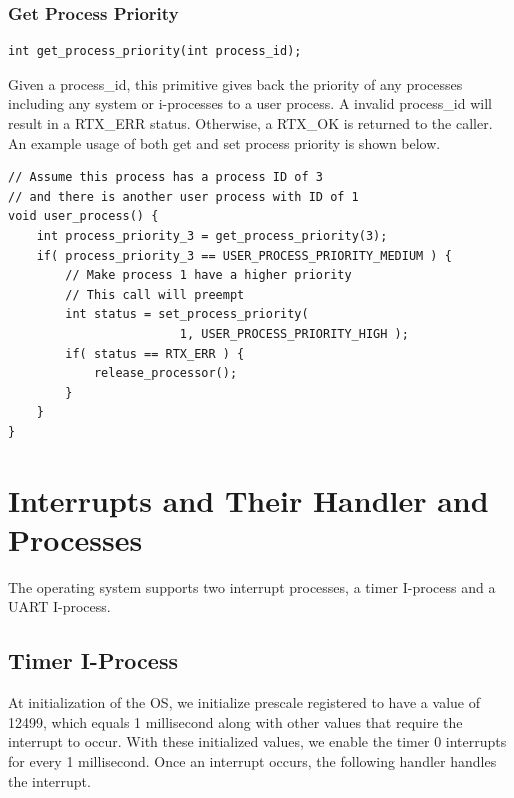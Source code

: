 \documentclass[12pt]{report}
\begin{document}
\bigskip

\subsection{Get Process Priority}
\label{sec:get_process_priority}
\begin{lstlisting}
int get_process_priority(int process_id);
\end{lstlisting}
Given a process\_id, this primitive gives back the priority of any processes including any system or i-processes to a user process. A invalid process\_id will result in a RTX\_ERR status. Otherwise, a RTX\_OK is returned to the caller. An example usage of both get and set process priority is shown below.

\begin{lstlisting}
// Assume this process has a process ID of 3
// and there is another user process with ID of 1
void user_process() {
    int process_priority_3 = get_process_priority(3);
    if( process_priority_3 == USER_PROCESS_PRIORITY_MEDIUM ) {
        // Make process 1 have a higher priority
        // This call will preempt
        int status = set_process_priority(
                        1, USER_PROCESS_PRIORITY_HIGH );
        if( status == RTX_ERR ) {
            release_processor();
        }
    }
}
\end{lstlisting}


\chapter{Interrupts and Their Handler and Processes}
The operating system supports two interrupt processes, a timer I-process and a UART I-process.
\section{Timer I-Process}
At initialization of the OS, we initialize prescale registered to have a value of 12499, which equals 1 millisecond along with other values that require the interrupt to occur. With these initialized values, we enable the timer 0 interrupts for every 1 millisecond. Once an interrupt occurs, the following handler handles the interrupt.
\end{document}

